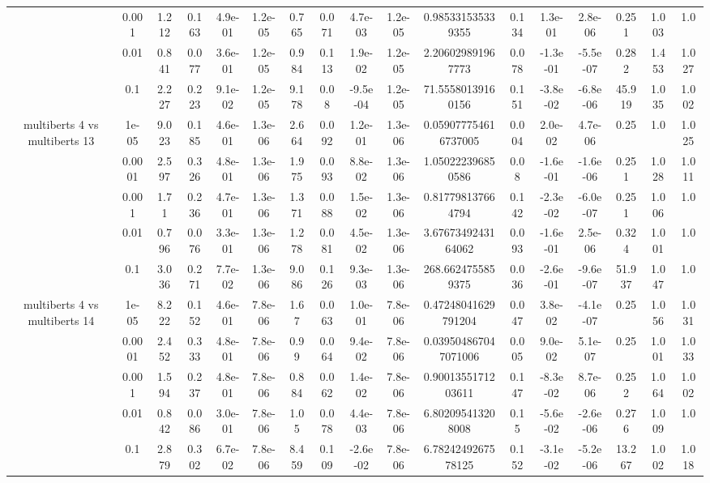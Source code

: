 \begin{tabular}{|c|c|c|c|c|c|c|c|c|c|c|c|c|c|c|c|c|}
 & 0.001 & 1.212 & 0.163 & 4.9e-01 & 1.2e-05 & 0.765 & 0.071 & 4.7e-03 & 1.2e-05 & 0.985331535339355 & 0.134 & 1.3e-01 & 2.8e-06 & 0.251 & 1.003 & 1.0 \\
 & 0.01 & 0.841 & 0.077 & 3.6e-01 & 1.2e-05 & 0.984 & 0.113 & 1.9e-02 & 1.2e-05 & 2.206029891967773 & 0.078 & -1.3e-01 & -5.5e-07 & 0.282 & 1.453 & 1.027 \\
 & 0.1 & 2.227 & 0.223 & 9.1e-02 & 1.2e-05 & 9.178 & 0.08 & -9.5e-04 & 1.2e-05 & 71.55580139160156 & 0.151 & -3.8e-02 & -6.8e-06 & 45.919 & 1.035 & 1.002 \\
\hline
\multirow{5}{*}{multiberts 4 vs multiberts 13} & 1e-05 & 9.023 & 0.185 & 4.6e-01 & 1.3e-06 & 2.664 & 0.092 & 1.2e-01 & 1.3e-06 & 0.059077754616737005 & 0.004 & 2.0e-02 & 4.7e-06 & 0.25 & 1.0 & 1.025 \\
 & 0.0001 & 2.597 & 0.326 & 4.8e-01 & 1.3e-06 & 1.975 & 0.093 & 8.8e-02 & 1.3e-06 & 1.050222396850586 & 0.08 & -1.6e-01 & -1.6e-06 & 0.251 & 1.028 & 1.011 \\
 & 0.001 & 1.71 & 0.236 & 4.7e-01 & 1.3e-06 & 1.371 & 0.088 & 1.5e-02 & 1.3e-06 & 0.817798137664794 & 0.142 & -2.3e-02 & -6.0e-07 & 0.251 & 1.006 & 1.0 \\
 & 0.01 & 0.796 & 0.076 & 3.3e-01 & 1.3e-06 & 1.278 & 0.081 & 4.5e-02 & 1.3e-06 & 3.6767349243164062 & 0.093 & -1.6e-01 & 2.5e-06 & 0.324 & 1.001 & 1.0 \\
 & 0.1 & 3.036 & 0.271 & 7.7e-02 & 1.3e-06 & 9.086 & 0.126 & 9.3e-03 & 1.3e-06 & 268.6624755859375 & 0.036 & -2.6e-01 & -9.6e-07 & 51.937 & 1.047 & 1.0 \\
\hline
\multirow{5}{*}{multiberts 4 vs multiberts 14} & 1e-05 & 8.222 & 0.152 & 4.6e-01 & 7.8e-06 & 1.67 & 0.063 & 1.0e-01 & 7.8e-06 & 0.47248041629791204 & 0.047 & 3.8e-02 & -4.1e-07 & 0.25 & 1.056 & 1.031 \\
 & 0.0001 & 2.452 & 0.333 & 4.8e-01 & 7.8e-06 & 0.99 & 0.064 & 9.4e-02 & 7.8e-06 & 0.039504867047071006 & 0.005 & 9.0e-02 & 5.1e-07 & 0.25 & 1.001 & 1.033 \\
 & 0.001 & 1.594 & 0.237 & 4.8e-01 & 7.8e-06 & 0.884 & 0.062 & 1.4e-02 & 7.8e-06 & 0.9001355171203611 & 0.147 & -8.3e-02 & 8.7e-06 & 0.252 & 1.064 & 1.002 \\
 & 0.01 & 0.842 & 0.086 & 3.0e-01 & 7.8e-06 & 1.05 & 0.078 & 4.4e-03 & 7.8e-06 & 6.802095413208008 & 0.15 & -5.6e-02 & -2.6e-06 & 0.276 & 1.009 & 1.0 \\
 & 0.1 & 2.879 & 0.302 & 6.7e-02 & 7.8e-06 & 8.459 & 0.109 & -2.6e-02 & 7.8e-06 & 6.7824249267578125 & 0.152 & -3.1e-02 & -5.2e-06 & 13.267 & 1.002 & 1.018 \\

\end{tabular}
